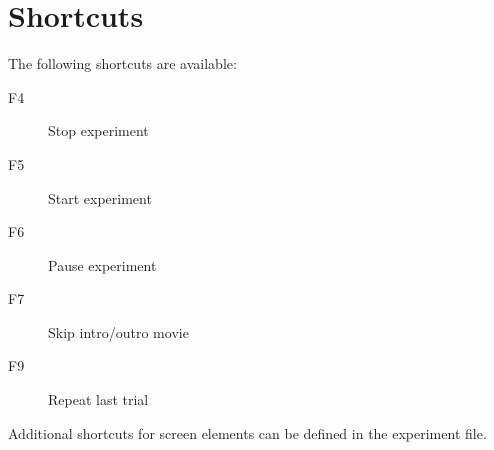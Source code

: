 



\section{Shortcuts}

The following shortcuts are available:

\begin{description}
\item[F4] Stop experiment
\item[F5] Start experiment
\item[F6] Pause experiment
\item[F7] Skip intro/outro movie
\item[F9] Repeat last trial
\end{description}

Additional shortcuts for screen elements can be defined in the experiment file.

